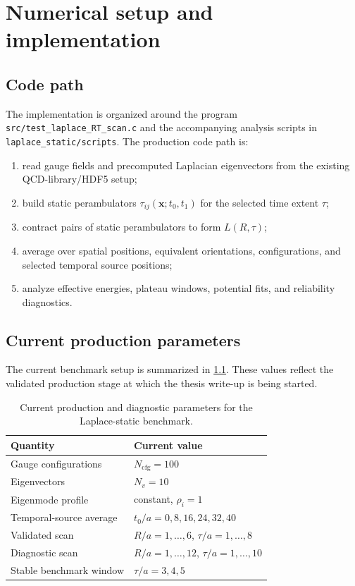 \chapter{Numerical setup and implementation}
\label{chap:numerical-setup}

\section{Code path}
The implementation is organized around the program \texttt{src/test\_laplace\_RT\_scan.c} and the accompanying analysis scripts in \texttt{laplace\_static/scripts}. The production code path is:
\begin{enumerate}
  \item read gauge fields and precomputed Laplacian eigenvectors from the existing QCD-library/HDF5 setup;
  \item build static perambulators \(\tau_{ij}(\bm x;t_0,t_1)\) for the selected time extent \(\tau\);
  \item contract pairs of static perambulators to form \(L(R,\tau)\);
  \item average over spatial positions, equivalent orientations, configurations, and selected temporal source positions;
  \item analyze effective energies, plateau windows, potential fits, and reliability diagnostics.
\end{enumerate}

\section{Current production parameters}
The current benchmark setup is summarized in \cref{tab:production-setup}. These values reflect the validated production stage at which the thesis write-up is being started.

\begin{table}[htbp]
\centering
\caption{Current production and diagnostic parameters for the Laplace-static benchmark.}
\label{tab:production-setup}
\begin{tabular}{ll}
\toprule
Quantity & Current value \\
\midrule
Gauge configurations & \(N_{\mathrm{cfg}}=100\) \\
Eigenvectors & \(N_v=10\) \\
Eigenmode profile & constant, \(\rho_i=1\) \\
Temporal-source average & \(t_0/a=0,8,16,24,32,40\) \\
Validated scan & \(R/a=1,\ldots,6\), \(\tau/a=1,\ldots,8\) \\
Diagnostic scan & \(R/a=1,\ldots,12\), \(\tau/a=1,\ldots,10\) \\
Stable benchmark window & \(\tau/a=3,4,5\) \\
\bottomrule
\end{tabular}
\end{table}

